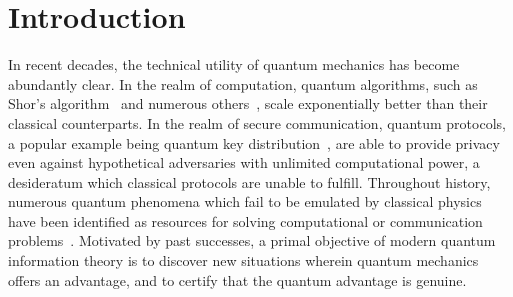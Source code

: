 \documentclass[aps, 10pt, english, twoside, pra, nofootinbib, tightenlines, longbibliography, superscriptaddress]{revtex4-1}
\begin{document}
    \section{Introduction}
    \label{sec:introduction}
    In recent decades, the technical utility of quantum mechanics has become abundantly clear. In the realm of computation, quantum algorithms, such as Shor's algorithm~\cite{Shor_1997} and numerous others~\cite{Jordan_2016}, scale exponentially better than their classical counterparts. In the realm of secure communication, quantum protocols, a popular example being quantum key distribution~\cite{Bennett_2014}, are able to provide privacy even against hypothetical adversaries with unlimited computational power, a desideratum which classical protocols are unable to fulfill. Throughout history, numerous quantum phenomena which fail to be emulated by classical physics have been identified as resources for solving computational or communication problems~\cite{Neilsen_Chaung_2011}. Motivated by past successes, a primal objective of modern quantum information theory is to discover new situations wherein quantum mechanics offers an advantage, and to certify that the quantum advantage is genuine.
\end{document}
